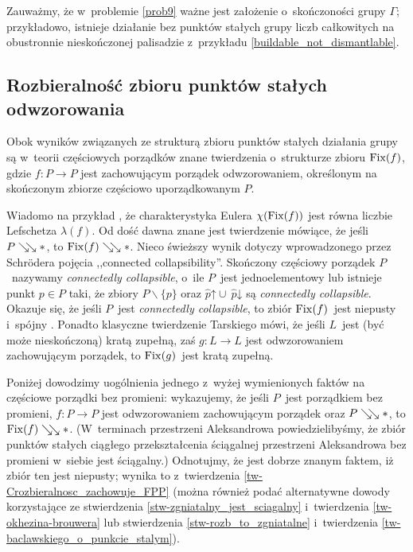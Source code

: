 Zauważmy, że w~problemie \ref{prob9} ważne jest założenie o~skończoności grupy $\Gamma$; przykładowo, istnieje działanie bez punktów stałych grupy liczb całkowitych na obustronnie nieskończonej palisadzie z~przykładu \ref{buildable_not_dismantlable}.





\subsection{Rozbieralność zbioru punktów stałych odwzorowania}\label{subsec-rozbieralnosc_zbioru_fixpunktow_odwzorowania}
Obok wyników związanych ze strukturą zbioru punktów stałych działania grupy są w~teorii częściowych porządków znane twierdzenia o~strukturze zbioru $\operatorname{Fix}(f)$, gdzie $f\colon P\to P$ jest zachowującym porządek odwzorowaniem, określonym na skończonym zbiorze częściowo uporządkowanym $P$. 

Wiadomo na przykład \cite[Theorem 1.1]{Baclawski79}, że charakterystyka Eulera $\chi(\operatorname{Fix}(f))$ jest równa liczbie Lefschetza $\lambda(f)$. Od dość dawna znane jest twierdzenie \cite[Theorem 3]{Duffus80a} mówiące, że jeśli $P\searrow\!\!\searrow *$, to $\operatorname{Fix}(f)\searrow\!\!\searrow *$. Nieco świeższy wynik dotyczy wprowadzonego przez  Schr{\"o}dera \cite{Schroder99} pojęcia ,,connected collapsibility''. Skończony częściowy porządek $P$~nazywamy \textit{connectedly collapsible}, o~ile $P$~jest jednoelementowy lub istnieje punkt $p\in P$ taki, że zbiory $P\smallsetminus \{p\}$ oraz $\hat{p}\mathord{\uparrow}\cup\ \hat{p}\mathord{\downarrow}$ są \textit{connectedly collapsible}. Okazuje się, że jeśli $P$~jest \textit{connectedly collapsible}, to zbiór $\operatorname{Fix}(f)$~jest niepusty i~spójny \cite[Proposition 5.6]{Schroder99}. 
Ponadto klasyczne twierdzenie Tarskiego \cite[Theorem 1]{Tarski55} mówi, że jeśli $L$~jest (być może nieskończoną) kratą zupełną, zaś $g\colon L\to L$ jest odwzorowaniem zachowującym porządek, to $\operatorname{Fix}(g)$~jest kratą zupełną.

Poniżej dowodzimy uogólnienia jednego z~wyżej wymienionych faktów na częściowe porządki bez promieni: wykazujemy, że jeśli $P$~jest porządkiem bez promieni, $f\colon P\to P$ jest odwzorowaniem zachowującym porządek oraz $P\searrow\!\!\searrow *$, to $\operatorname{Fix}(f)\searrow\!\!\searrow *$. (W~terminach przestrzeni Aleksandrowa powiedzielibyśmy, że zbiór punktów stałych ciągłego przekształcenia ściągalnej przestrzeni Aleksandrowa bez promieni w~siebie jest ściągalny.) Odnotujmy, że jest dobrze znanym faktem, iż zbiór ten jest niepusty; wynika to z~twierdzenia \ref{tw-Crozbieralnosc_zachowuje_FPP} (można również podać alternatywne dowody korzystające ze stwierdzenia \ref{stw-zgniatalny_jest_sciagalny} i~twierdzenia \ref{tw-okhezina-brouwera} lub stwierdzenia \ref{stw-rozb_to_zgniatalne} i~twierdzenia \ref{tw-baclawskiego_o_punkcie_stalym}).

